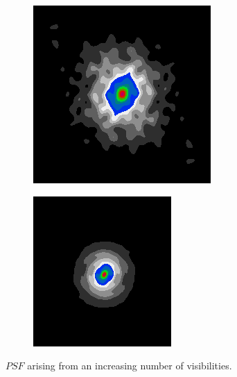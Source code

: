 \begin{figure}[h]
	\centering
	\begin{subfigure}[b]{0.3\linewidth}
		\includegraphics[width=\linewidth]{./chapters/03.distribution/simulated/psf.png}
	\end{subfigure}
	\begin{subfigure}[b]{0.3\linewidth}
		\includegraphics[width=\linewidth]{./chapters/06.gradient/psf_cut.png}
	\end{subfigure}
	
	\caption{$PSF$ arising from an increasing number of visibilities.}
\end{figure} 

